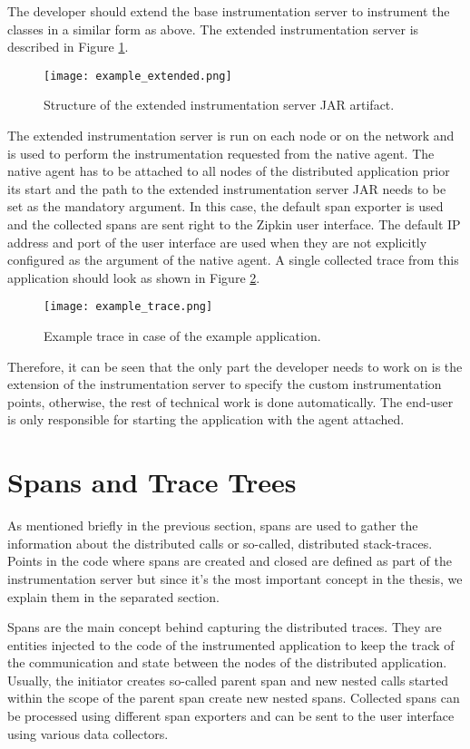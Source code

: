 The developer should extend the base instrumentation server to instrument the classes in a similar form as above. The extended instrumentation server is described in Figure \ref{fig:example_extended}.

	\begin{figure}
		\centering
		\texttt{[image: example\_extended.png]}
		\caption{Structure of the extended instrumentation server JAR artifact.}
		\label{fig:example_extended}
	\end{figure}
The extended instrumentation server is run on each node or on the network and is used to perform the instrumentation requested from the native agent. The native agent has to be attached to all nodes of the distributed application prior its start and the path to the extended instrumentation server JAR needs to be set as the mandatory argument. In this case, the default span exporter is used and the collected spans are sent right to the Zipkin user interface. The default IP address and port of the user interface are used when they are not explicitly configured as the argument of the native agent. A single collected trace from this application should look as shown in Figure \ref{fig:example_trace}.

	\begin{figure}
		\centering
		\texttt{[image: example\_trace.png]}
		\caption{Example trace in case of the example application.}
		\label{fig:example_trace}
	\end{figure}

Therefore, it can be seen that the only part the developer needs to work on is the extension of the instrumentation server to specify the custom instrumentation points, otherwise, the rest of technical work is done automatically. The end-user is only responsible for starting the application with the agent attached.

\section{Spans and Trace Trees}
\label{subsec:spans}
As mentioned briefly in the previous section, spans are used to gather the information about the distributed calls or so-called, distributed stack-traces. Points in the code where spans are created and closed are defined as part of the instrumentation server but since it's the most important concept in the thesis, we explain them in the separated section. 

Spans are the main concept behind capturing the distributed traces. They are entities injected to the code of the instrumented application to keep the track of the communication and state between the nodes of the distributed application. Usually, the initiator creates so-called parent span and new nested calls started within the scope of the parent span create new nested spans. Collected spans can be processed using different span exporters and can be sent to the user interface using various data collectors.

